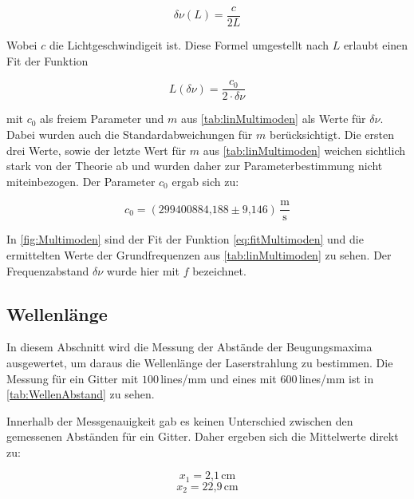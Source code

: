 \begin{equation}
\delta \nu (L) = \frac{c}{2L}
\end{equation}

Wobei $c$ die Lichtgeschwindigeit ist. Diese Formel umgestellt nach $L$ erlaubt einen Fit der Funktion

\begin{equation}
L (\delta \nu) = \frac{c_0}{2\cdot \delta \nu}
\label{eq:fitMultimoden}
\end{equation}

mit $c_0$ als freiem Parameter und $m$ aus \autoref{tab:linMultimoden} als Werte für $\delta \nu$. Dabei wurden auch die Standardabweichungen für $m$ berücksichtigt. Die ersten drei Werte, sowie der letzte Wert für $m$ aus \autoref{tab:linMultimoden} weichen sichtlich stark von der Theorie ab und wurden daher zur Parameterbestimmung nicht miteinbezogen. Der Parameter $c_0$ ergab sich zu:

\begin{equation}
c_0 = (\text{299400884,188} \pm \text{9,146})\, \frac{\text{m}}{\text{s}}
\end{equation}

In \autoref{fig:Multimoden} sind der Fit der Funktion \autoref{eq:fitMultimoden} und die ermittelten Werte der Grundfrequenzen aus \autoref{tab:linMultimoden} zu sehen. Der Frequenzabstand $\delta \nu$ wurde hier mit $f$ bezeichnet.







\subsection{Wellenlänge}
\label{sec:Wellenlänge}

In diesem Abschnitt wird die Messung der Abstände der Beugungsmaxima ausgewertet, um daraus die Wellenlänge der Laserstrahlung zu bestimmen.
Die Messung für ein Gitter mit $100$\,lines/mm und eines mit $600$\,lines/mm ist in \autoref{tab:WellenAbstand} zu sehen.

Innerhalb der Messgenauigkeit gab es keinen Unterschied zwischen den gemessenen Abständen für ein Gitter. Daher ergeben sich die Mittelwerte direkt zu:

\begin{equation}
x_1 = \text{2,1}\,\text{cm}
\end{equation}
\begin{equation}
x_2 = \text{22,9}\,\text{cm}
\end{equation}


